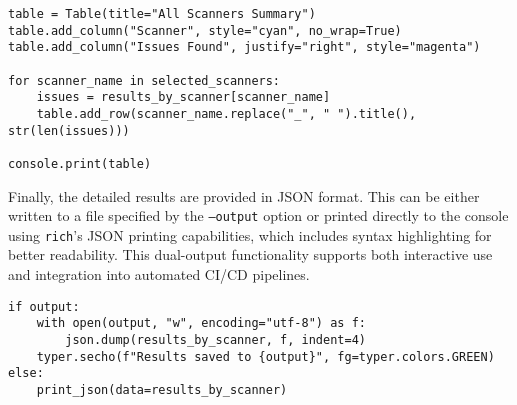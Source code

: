 \begin{verbatim}
table = Table(title="All Scanners Summary")
table.add_column("Scanner", style="cyan", no_wrap=True)
table.add_column("Issues Found", justify="right", style="magenta")

for scanner_name in selected_scanners:
    issues = results_by_scanner[scanner_name]
    table.add_row(scanner_name.replace("_", " ").title(), str(len(issues)))

console.print(table)
\end{verbatim}

Finally, the detailed results are provided in JSON format. This can be either written to a file specified by the \texttt{--output} option or printed directly to the console using \texttt{rich}'s JSON printing capabilities, which includes syntax highlighting for better readability. This dual-output functionality supports both interactive use and integration into automated CI/CD pipelines.

\begin{verbatim}
if output:
    with open(output, "w", encoding="utf-8") as f:
        json.dump(results_by_scanner, f, indent=4)
    typer.secho(f"Results saved to {output}", fg=typer.colors.GREEN)
else:
    print_json(data=results_by_scanner)
\end{verbatim}
